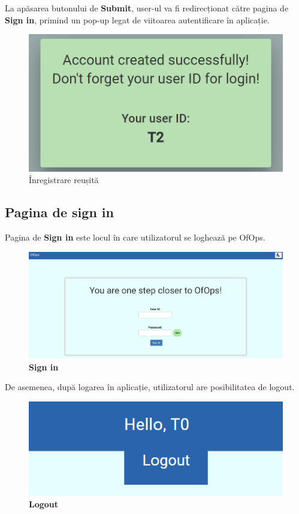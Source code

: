 La apăsarea butonului de \textbf{Submit}, user-ul va fi redirecționat către pagina de \textbf{Sign in}, primind un pop-up legat de viitoarea autentificare în aplicație.  

\begin{figure}[!htb]
    \centering
    \includegraphics[width=0.9\linewidth]{images/autentf.png}
    \caption{Înregistrare reușită}
    \label{fig:autentf}
\end{figure}

\subsection{Pagina de sign in}
Pagina de \textbf{Sign in} este locul în care utilizatorul se loghează pe OfOps. 

\begin{figure}[!htb]
    \centering
    \includegraphics[width=0.9\linewidth]{images/signin.png}
    \caption{\textbf{Sign in}}
    \label{fig:signin}
\end{figure}

\newpage

De asemenea, după logarea în aplicație, utilizatorul are posibilitatea de logout.

\begin{figure}[!htb]
    \centering
    \includegraphics[width=0.9\linewidth]{images/logout.png}
    \caption{\textbf{Logout}}
    \label{fig:logout}
\end{figure}

